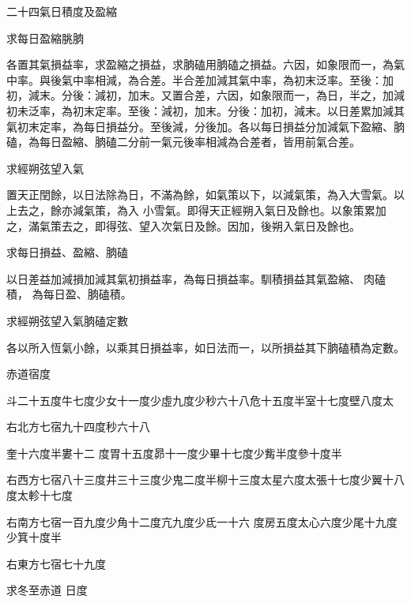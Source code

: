 \begin{pinyinscope}
 二十四氣日積度及盈縮



 求每日盈縮朓朒



 各置其氣損益率，求盈縮之損益，求朒磕用朒磕之損益。六因，如象限而一，為氣中率。與後氣中率相減，為合差。半合差加減其氣中率，為初末泛率。至後：加初，減末。分後：減初，加末。又置合差，六因，如象限而一，為日，半之，加減初未泛率，為初末定率。至後：減初，加末。分後：加初，減末。以日差累加減其氣初末定率，為每日損益分。至後減，分後加。各以每日損益分加減氣下盈縮、朒磕，為每日盈縮、朒磕二分前一氣元後率相減為合差者，皆用前氣合差。



 求經朔弦望入氣



 置天正閏餘，以日法除為日，不滿為餘，如氣策以下，以減氣策，為入大雪氣。以上去之，餘亦減氣策，為入
 小雪氣。即得天正經朔入氣日及餘也。以象策累加之，滿氣策去之，即得弦、望入次氣日及餘。因加，後朔入氣日及餘也。



 求每日損益、盈縮、朒磕



 以日差益加減損加減其氣初損益率，為每日損益率。馴積損益其氣盈縮、肉磕積，
 為每日盈、朒磕積。



 求經朔弦望入氣朒磕定數



 各以所入恆氣小餘，以乘其日損益率，如日法而一，以所損益其下朒磕積為定數。



 赤道宿度



 斗二十五度牛七度少女十一度少虛九度少秒六十八危十五度半室十七度壁八度太



 右北方七宿九十四度秒六十八



 奎十六度半婁十二
 度胃十五度昴十一度少畢十七度少觜半度參十度半



 右西方七宿八十三度井三十三度少鬼二度半柳十三度太星六度太張十七度少翼十八度太軫十七度



 右南方七宿一百九度少角十二度亢九度少氐一十六
 度房五度太心六度少尾十九度少箕十度半



 右東方七宿七十九度



 求冬至赤道
 日度




\end{pinyinscope}
